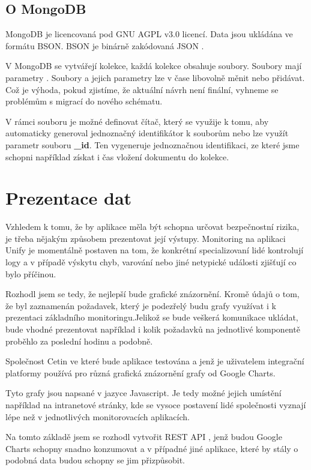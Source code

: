 \documentclass[thesis=M,czech]{FITthesis}[2012/10/20]
\begin{document}
		\subsection{O MongoDB}
			MongoDB je licencovaná pod  GNU AGPL v3.0 \cite{mongo_gnu} licencí. Data jsou ukládána ve formátu BSON. BSON je binárně zakódovaná JSON \cite{bsonspec.org}.

			V MongoDB se vytvářejí kolekce, každá kolekce obsahuje soubory. Soubory mají parametry \cite{mongoDB}. Soubory a jejich parametry lze v čase libovolně měnit nebo přidávat. Což je výhoda, pokud zjistíme, že aktuální návrh není finální, vyhneme se problémům s migrací do nového schématu.

			V rámci souboru je možné definovat čítač, který se využije k tomu, aby automaticky generoval jednoznačný identifikátor k souborům nebo lze využít parametr souboru \textbf{\_id}. Ten vygeneruje jednoznačnou identifikaci, ze které jsme schopni například získat i čas vložení dokumentu do kolekce. 

		
	\section{Prezentace dat}
		\label{sec:data_prezentation}
		Vzhledem k tomu, že by aplikace měla být schopna určovat bezpečnostní rizika, je třeba nějakým způsobem prezentovat její výstupy. Monitoring na aplikaci Unify je momentálně postaven na tom, že konkrétní specializovaní lidé kontrolují logy a v případě výskytu chyb, varování nebo jiné netypické události zjišťují co bylo příčinou.
		
		Rozhodl jsem se tedy, že nejlepší bude grafické znázornění. Kromě údajů o tom, že byl zaznamenán požadavek, který je podezřelý budu grafy využívat i k prezentaci základního monitoringu.Jelikož se bude veškerá komunikace ukládat, bude vhodné prezentovat například i kolik požadavků na jednotlivé komponentě proběhlo za poslední hodinu a podobně.
		
		Společnost Cetin \cite{cetin} ve které bude aplikace testována a jenž je uživatelem integrační platformy používá pro různá grafická znázornění grafy od Google Charts\cite{googleCharts}. 
		
		Tyto grafy jsou napsané v jazyce Javascript. Je tedy možné jejich umístění například na intranetové stránky, kde se vysoce postavení lidé společnosti vyznají lépe než v jednotlivých monitorovacích aplikacích.
		
		Na tomto základě jsem se rozhodl vytvořit REST API \cite{rest}, jenž budou Google Charts schopny snadno konzumovat a v případné jiné aplikace, které by stály o podobná data budou schopny se jim přizpůsobit.
		
\end{document}
